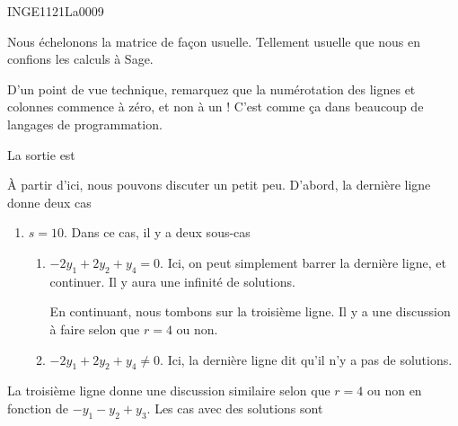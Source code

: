 

\begin{corrige}{INGE1121La0009}

	Nous échelonons la matrice de façon usuelle. Tellement usuelle que nous en confions les calculs à Sage.


	D'un point de vue technique, remarquez que la numérotation des lignes et colonnes commence à zéro, et non à un ! C'est comme ça dans beaucoup de langages de programmation.

	La sortie est


	À partir d'ici, nous pouvons discuter un petit peu. D'abord, la dernière ligne donne deux cas
	\begin{enumerate}

		\item
			$s=10$. Dans ce cas, il y a deux sous-cas
			\begin{enumerate}

				\item
					$-2y_1+2y_2+y_4=0$. Ici, on peut simplement barrer la dernière ligne, et continuer. Il y aura une infinité de solutions.

					
					En continuant, nous tombons sur la troisième ligne. Il y a une discussion à faire selon que $r=4$ ou non.
				\item $-2y_1+2y_2+y_4\neq 0$. Ici, la dernière ligne dit qu'il n'y a pas de solutions.

			\end{enumerate}
			

	\end{enumerate}
	
	La troisième ligne donne une discussion similaire selon que $r=4$ ou non en fonction de $-y_1-y_2+y_3$. Les cas avec des solutions sont
	\begin{enumerate}


\end{enumerate}
\end{corrige}
